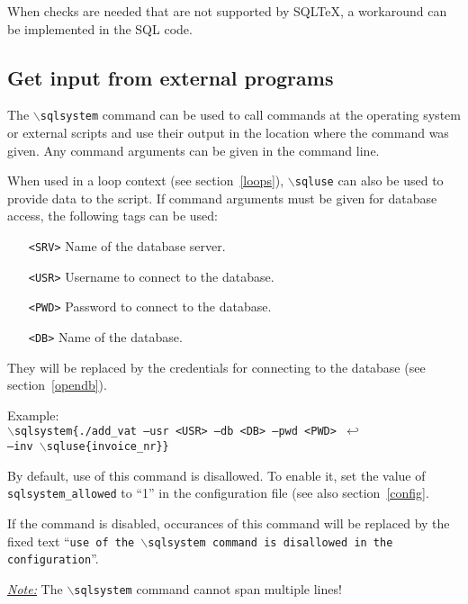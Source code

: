 \documentclass{article}
\newcommand{\bs}{\ensuremath{\backslash}}
\newcommand{\vs}{\vspace{3mm}}
\begin{document}
When checks are needed that are not supported by SQL\TeX, a workaround can be implemented in the SQL code.


\subsection{Get input from external programs}\label{sqlsystem}

The \texttt{\bs sqlsystem} command can be used to call commands at the operating system or external scripts and use their output in the location where the command was given. Any command arguments can be given in the command line.

When used in a loop context (see section~\ref{loops}), \texttt{\bs sqluse} can also be used to  provide data to the script. If command arguments must be given for database access, the following tags can be used:

\begin{itemize}
\item[\texttt{<SRV>}] Name of the database server.
\item[\texttt{<USR>}] Username to connect to the database.
\item[\texttt{<PWD>}] Password to connect to the database.
\item[\texttt{<DB>}] Name of the database.
\end{itemize}

They will be replaced by the credentials for connecting to the database (see section~\ref{opendb}).


\vs

\noindent Example:\\
\texttt{\bs sqlsystem\{./add\_vat --usr <USR> --db <DB> --pwd <PWD> $\hookleftarrow$ \\
--inv \bs sqluse\{invoice\_nr\}\}}

\vs

By default, use of this command is disallowed. To enable it, set the value of \texttt{sqlsystem\_allowed} to ``1'' in the configuration file (see also section~\ref{config}.

If the command is disabled, occurances of this command will be replaced by the fixed text ``\texttt{use of the \bs sqlsystem command is disallowed in the configuration}''.

\vs

\noindent\hspace{-3mm}\textit{\underline{Note:}} The \texttt{\bs sqlsystem} command cannot span multiple lines!
\end{document}
